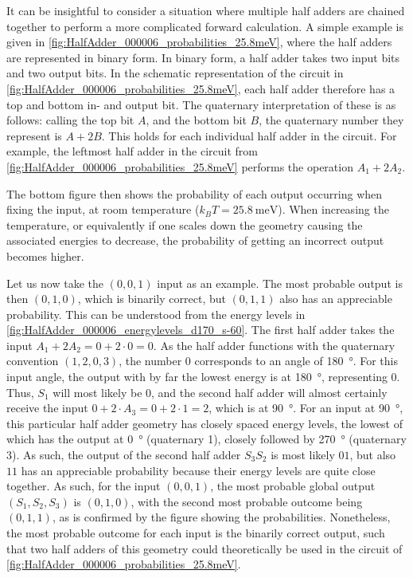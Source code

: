 \documentclass[11pt,a4paper,english,twoside]{article}
\begin{document}
It can be insightful to consider a situation where multiple half adders are chained together to perform a more complicated forward calculation. A simple example is given in \cref{fig:HalfAdder_000006_probabilities_25.8meV}, where the half adders are represented in binary form. In binary form, a half adder takes two input bits and two output bits. In the schematic representation of the circuit in \cref{fig:HalfAdder_000006_probabilities_25.8meV}, each half adder therefore has a top and bottom in- and output bit. The quaternary interpretation of these is as follows: calling the top bit $A$, and the bottom bit $B$, the quaternary number they represent is $A+2B$. This holds for each individual half adder in the circuit. For example, the leftmost half adder in the circuit from \cref{fig:HalfAdder_000006_probabilities_25.8meV} performs the operation $A_1+2A_2$. \par
The bottom figure then shows the probability of each output occurring when fixing the input, at room temperature ($k_B T=\SI{25.8}{\milli\electronvolt}$). When increasing the temperature, or equivalently if one scales down the geometry causing the associated energies to decrease, the probability of getting an incorrect output becomes higher. \par
Let us now take the $(0,0,1)$ input as an example. The most probable output is then $(0,1,0)$, which is binarily correct, but $(0,1,1)$ also has an appreciable probability. This can be understood from the energy levels in \cref{fig:HalfAdder_000006_energylevels_d170_s-60}. The first half adder takes the input $A_1 + 2A_2 = 0+2\cdot0=0$. As the half adder functions with the quaternary convention $(1,2,0,3)$, the number 0 corresponds to an angle of \SI{180}{\degree}. For this input angle, the output with by far the lowest energy is at \SI{180}{\degree}, representing 0. Thus, $S_1$ will most likely be 0, and the second half adder will almost certainly receive the input $0+2\cdot A_3=0+2\cdot1=2$, which is at \SI{90}{\degree}. For an input at \SI{90}{\degree}, this particular half adder geometry has closely spaced energy levels, the lowest of which has the output at \SI{0}{\degree} (quaternary 1), closely followed by \SI{270}{\degree} (quaternary 3). As such, the output of the second half adder $S_3 S_2$ is most likely $01$, but also $11$ has an appreciable probability because their energy levels are quite close together. As such, for the input $(0,0,1)$, the most probable global output $(S_1, S_2, S_3)$ is $(0,1,0)$, with the second most probable outcome being $(0,1,1)$, as is confirmed by the figure showing the probabilities. Nonetheless, the most probable outcome for each input is the binarily correct output, such that two half adders of this geometry could theoretically be used in the circuit of \cref{fig:HalfAdder_000006_probabilities_25.8meV}. \par
\end{document}
